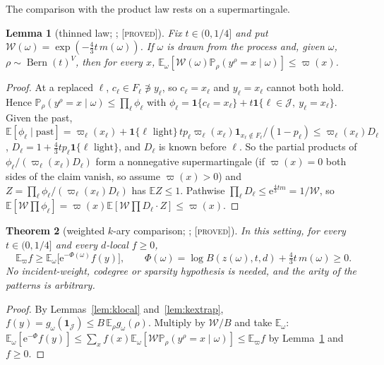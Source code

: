 \documentclass[10pt,reqno]{amsart}
\newtheorem{theorem}{Theorem}[section]
\newtheorem{lemma}[theorem]{Lemma}
\theoremstyle{definition}
\theoremstyle{remark}
\newcommand{\E}{\mathbb E}
\newcommand{\Prob}{\mathbb P}
\newcommand{\ind}{\mathbf 1}
\newcommand{\Bern}{\operatorname{Bern}}
\newcommand{\e}{\mathrm e}
\newcommand{\lab}[1]{\textup{[\textsc{#1}]}}
\begin{document}
The comparison with the product law rests on a supermartingale.

\begin{lemma}[thinned law; {\cite[Lemma~2.4]{KA}}; \lab{proved}]\label{lem:kthin}
Fix $t\in(0,1/4]$ and put $\mathcal W(\omega)=\exp(-\frac43t\,m(\omega))$.  If
$\omega$ is drawn from the process and, given $\omega$,
$\rho\sim\Bern(t)^V$, then for every $x$,
$\E_\omega[\mathcal W(\omega)\Prob_\rho(y^\rho=x\mid\omega)]\leq\varpi(x)$.
\end{lemma}
\begin{proof}
At a replaced $\ell$, $c_\ell\in F_\ell\not\ni y_\ell$, so $c_\ell=x_\ell$ and
$y_\ell=x_\ell$ cannot both hold.  Hence
$\Prob_\rho(y^\rho=x\mid\omega)\leq\prod_\ell\phi_\ell$ with
$\phi_\ell=\ind\{c_\ell=x_\ell\}+t\ind\{\ell\in\mathcal J,\ y_\ell=x_\ell\}$.  Given the
past,
$\E[\phi_\ell\mid\text{past}]=\varpi_\ell(x_\ell)+\ind\{\ell\text{ light}\}\,tp_\ell\varpi_\ell(x_\ell)\ind_{x_\ell\notin F_\ell}/(1-p_\ell)
\leq\varpi_\ell(x_\ell)D_\ell$, $D_\ell=1+\frac43tp_\ell\ind\{\ell\text{ light}\}$,
and $D_\ell$ is known before $\ell$.  So the partial products of
$\phi_\ell/(\varpi_\ell(x_\ell)D_\ell)$ form a nonnegative supermartingale (if
$\varpi(x)=0$ both sides of the claim vanish, so assume $\varpi(x)>0$)
and $Z=\prod_\ell\phi_\ell/(\varpi_\ell(x_\ell)D_\ell)$ has $\E Z\leq1$.  Pathwise
$\prod_\ell D_\ell\leq\e^{\frac43tm}=1/\mathcal W$, so
$\E[\mathcal W\prod\phi_\ell]=\varpi(x)\E[\mathcal W\prod D_\ell\cdot Z]\leq\varpi(x)$.
\end{proof}

\begin{theorem}[weighted $k$-ary comparison; {\cite[Thm~2.5]{KA}}; \lab{proved}]\label{thm:kcomp}
In this setting, for every $t\in(0,1/4]$ and every $d$-local $f\geq0$,
\[
 \E_\varpi f\geq\E_\omega\bigl[\e^{-\Phi(\omega)}f(y)\bigr],\qquad
 \Phi(\omega)=\log B(z(\omega),t,d)+\tfrac43t\,m(\omega)\geq0.
\]
No incident-weight, codegree or sparsity hypothesis is needed, and the
arity of the patterns is arbitrary.
\end{theorem}
\begin{proof}
By Lemmas~\ref{lem:klocal} and~\ref{lem:kextrap},
$f(y)=g_\omega(\ind_{\mathcal J})\leq B\,\E_\rho g_\omega(\rho)$.  Multiply by
$\mathcal W/B$ and take $\E_\omega$:
$\E_\omega[\e^{-\Phi}f(y)]\leq\sum_xf(x)\E_\omega[\mathcal W\Prob_\rho(y^\rho=x\mid\omega)]\leq\E_\varpi f$
by Lemma~\ref{lem:kthin} and $f\geq0$.
\end{proof}
\end{document}
